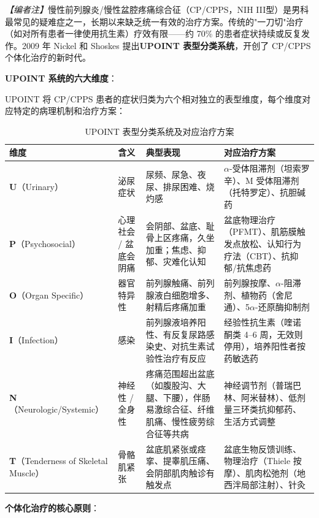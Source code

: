 \noindent\textit{【编者注】}慢性前列腺炎/慢性盆腔疼痛综合征（CP/CPPS，NIH III型）是男科最常见的疑难症之一，长期以来缺乏统一有效的治疗方案。传统的"一刀切"治疗（如对所有患者一律使用抗生素）疗效有限——约 70\% 的患者症状持续或反复发作。2009 年 Nickel 和 Shoskes 提出\textbf{UPOINT 表型分类系统}，开创了 CP/CPPS 个体化治疗的新时代。

\vspace{0.5em}
\noindent\textbf{UPOINT 系统的六大维度}：

UPOINT 将 CP/CPPS 患者的症状归类为六个相对独立的表型维度，每个维度对应特定的病理机制和治疗方案：

\begin{table}[htbp]
\centering
\caption{UPOINT 表型分类系统及对应治疗方案}
\label{tab:upoint}
\begin{tabularx}{\textwidth}{@{}llXX@{}}
    \toprule
    \textbf{维度} & \textbf{含义} & \textbf{典型表现} & \textbf{对应治疗方案} \\
    \midrule
    \textbf{U}（Urinary） & 泌尿症状 & 尿频、尿急、夜尿、排尿困难、烧灼感 & $\alpha$-受体阻滞剂（坦索罗辛）、M 受体阻滞剂（托特罗定）、抗胆碱药 \\
    \textbf{P}（Psychosocial） & 心理社会 / 盆底会阴痛 & 会阴部、盆底、耻骨上区疼痛，久坐加重；焦虑、抑郁、灾难化认知 & 盆底物理治疗（PFMT）、肌筋膜触发点放松、认知行为疗法（CBT）、抗抑郁/抗焦虑药 \\
    \textbf{O}（Organ Specific） & 器官特异性 & 前列腺触痛、前列腺液白细胞增多、射精后疼痛加重 & 前列腺按摩、$\alpha$-阻滞剂、植物药（舍尼通）、5$\alpha$-还原酶抑制剂 \\
    \textbf{I}（Infection） & 感染 & 前列腺液培养阳性、有反复尿路感染史、对抗生素试验性治疗有反应 & 经验性抗生素（喹诺酮类 4--6 周，无效则停用），培养阳性者按药敏选药 \\
    \textbf{N}（Neurologic/Systemic） & 神经性 / 全身性 & 疼痛范围超出盆底（如腹股沟、大腿、下腰），伴肠易激综合征、纤维肌痛、慢性疲劳综合征等共病 & 神经调节剂（普瑞巴林、阿米替林）、低剂量三环类抗抑郁药、生活方式调整 \\
    \textbf{T}（Tenderness of Skeletal Muscle） & 骨骼肌紧张 & 盆底肌紧张或痉挛、提睾肌压痛、会阴部肌肉触诊有触发点 & 盆底生物反馈训练、物理治疗（Thiele 按摩）、肌肉松弛剂（地西泮局部注射）、针灸 \\
    \bottomrule
\end{tabularx}
\end{table}

\vspace{0.5em}
\noindent\textbf{个体化治疗的核心原则}：

